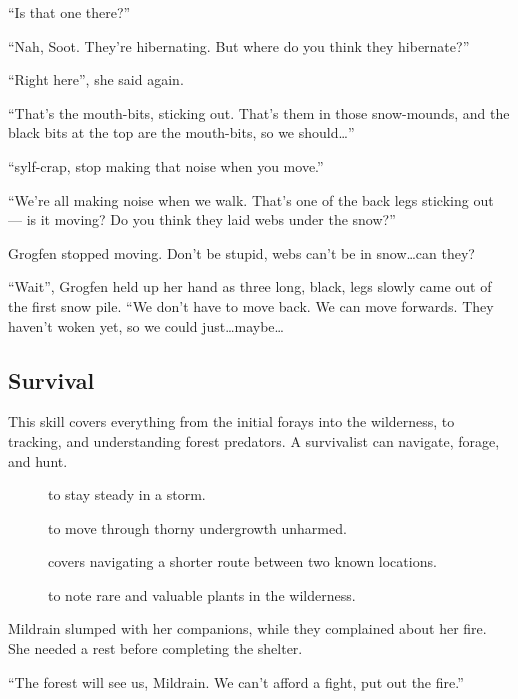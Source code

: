 \begin{multicols}{2}
\begin{exampletext}
  ``Is that one there?''

  ``Nah, Soot.
  They're hibernating.
  But where do you think they hibernate?''

  ``Right here'', she said again.
  {\small
    ``That's the mouth-bits, sticking out.
    That's them in those snow-mounds, and the black bits at the top are the mouth-bits, so we should\ldots''

    ``\Gls{sylf}-crap, stop making that noise when you move.''
  }{\footnotesize
    ``We're all making noise when we walk.
    That's one of the back legs sticking out --- is it moving?
    Do you think they laid webs under the snow?''

    Grogfen stopped moving.
    Don't be stupid, webs can't be in snow\ldots can they?
  }{\scriptsize
    ``Wait'',
    Grogfen held up her hand as three long, black, legs slowly came out of the first snow pile.
    ``We don't have to move back.
    We can move forwards.
    They haven't woken yet, so we could just\ldots maybe\ldots
  }

\end{exampletext}

\subsection{Survival}

This skill covers everything from the initial forays into the wilderness, to tracking, and understanding forest predators.
A survivalist can navigate, forage, and hunt.

\begin{description}
  \item[]
    to stay steady in a storm.
  \item[]
    to move through thorny undergrowth unharmed.
  \item[]
    covers navigating a shorter route between two known locations.
  \item[]
    to note rare and valuable plants in the wilderness.
\end{description}

\begin{exampletext}
  Mildrain slumped with her companions, while they complained about her fire.
  She needed a rest before completing the shelter.

  ``The forest will see us, Mildrain.
  We can't afford a fight, put out the fire.''


\end{exampletext}
\end{multicols}

